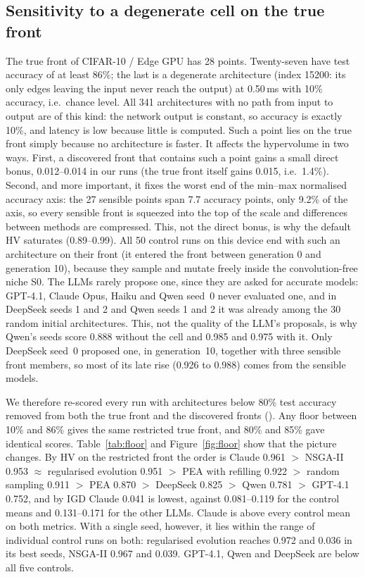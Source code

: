 \subsection{Sensitivity to a degenerate cell on the true front}\label{sec:degenerate}
The true front of CIFAR-10 / Edge GPU has 28 points. Twenty-seven have test accuracy of at least 86\%; the last is a degenerate architecture (index 15200: its only edges leaving the input never reach the output) at 0.50\,ms with 10\% accuracy, i.e.\ chance level. All 341 architectures with no path from input to output are of this kind: the network output is constant, so accuracy is exactly 10\%, and latency is low because little is computed. Such a point lies on the true front simply because no architecture is faster. It affects the hypervolume in two ways. First, a discovered front that contains such a point gains a small direct bonus, 0.012--0.014 in our runs (the true front itself gains 0.015, i.e.\ 1.4\%). Second, and more important, it fixes the worst end of the min--max normalised accuracy axis: the 27 sensible points span 7.7 accuracy points, only 9.2\% of the axis, so every sensible front is squeezed into the top of the scale and differences between methods are compressed. This, not the direct bonus, is why the default HV saturates (0.89--0.99). All 50 control runs on this device end with such an architecture on their front (it entered the front between generation 0 and generation 10), because they sample and mutate freely inside the convolution-free niche S0. The LLMs rarely propose one, since they are asked for accurate models: GPT-4.1, Claude Opus, Haiku and Qwen seed~0 never evaluated one, and in DeepSeek seeds 1 and 2 and Qwen seeds 1 and 2 it was already among the 30 random initial architectures. This, not the quality of the LLM's proposals, is why Qwen's seeds score 0.888 without the cell and 0.985 and 0.975 with it. Only DeepSeek seed~0 proposed one, in generation~10, together with three sensible front members, so most of its late rise (0.926 to 0.988) comes from the sensible models.

We therefore re-scored every run with architectures below 80\% test accuracy removed from both the true front and the discovered fronts (). Any floor between 10\% and 86\% gives the same restricted true front, and 80\% and 85\% gave identical scores. Table~\ref{tab:floor} and Figure~\ref{fig:floor} show that the picture changes. By HV on the restricted front the order is Claude 0.961 $>$ NSGA-II 0.953 $\approx$ regularised evolution 0.951 $>$ PEA with refilling 0.922 $>$ random sampling 0.911 $>$ PEA 0.870 $>$ DeepSeek 0.825 $>$ Qwen 0.781 $>$ GPT-4.1 0.752, and by IGD Claude 0.041 is lowest, against 0.081--0.119 for the control means and 0.131--0.171 for the other LLMs. Claude is above every control mean on both metrics. With a single seed, however, it lies within the range of individual control runs on both: regularised evolution reaches 0.972 and 0.036 in its best seeds, NSGA-II 0.967 and 0.039. GPT-4.1, Qwen and DeepSeek are below all five controls.

